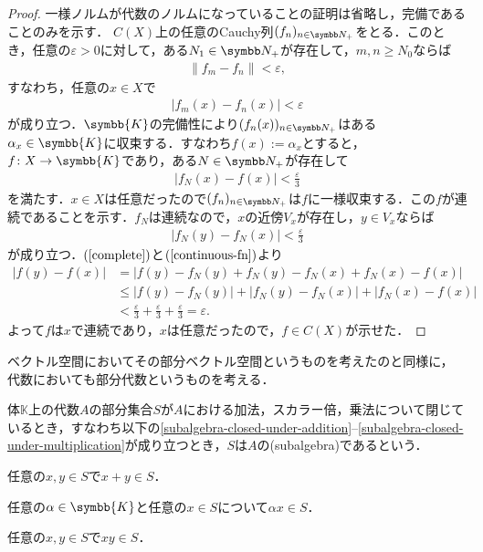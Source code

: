 \documentclass[../main.tex]{subfiles}
\begin{document}
\begin{proof} 一様ノルムが代数のノルムになっていることの証明は省略し，完備であることのみを示す．
\(C(X)\)上の任意のCauchy列\((f_n)_{n \in \PositiveInteger}\)をとる．このとき，任意の\(\varepsilon > 0\)に対して，ある\(N_1 \in \PositiveInteger\)が存在して，\(m, n \geq N_0\)ならば
\begin{align*}
  \lVert f_m - f_n \rVert < \varepsilon,
\end{align*}
すなわち，任意の\(x \in X\)で
\begin{align*}
  |f_m(x) - f_n(x)| < \varepsilon
\end{align*}
が成り立つ．\(\symbb{K}\)の完備性により\((f_n(x))_{n \in \PositiveInteger}\)はある\(\alpha_x \in \symbb{K}\)に収束する．すなわち\(f(x) := \alpha_x\)とすると，\(f\colon X \to \symbb{K}\)であり，ある\(N \in \PositiveInteger\)が存在して
\begin{align}
  |f_N(x) - f(x)| < \frac{\varepsilon}{3}
  \label{complete}
\end{align}
を満たす．\(x \in X\)は任意だったので\((f_n)_{n \in \PositiveInteger}\)は\(f\)に一様収束する．この\(f\)が連続であることを示す．\(f_N\)は連続なので，\(x\)の近傍\(V_x\)が存在し，\(y \in V_x\)ならば
\begin{align}
  |f_N(y) - f_N(x)| < \frac{\varepsilon}{3}
  \label{continuous-fn}
\end{align}
が成り立つ．\((\ref{complete})\)と\((\ref{continuous-fn})\)より
\begin{align*}
  |f(y) - f(x)|
  &= |f(y) - f_N(y) + f_N(y) - f_N(x) + f_N(x) - f(x)| \\
  &\leq |f(y) - f_N(y)| + |f_N(y) - f_N(x)| + |f_N(x) - f(x)| \\
  &< \frac{\varepsilon}{3} + \frac{\varepsilon}{3} + \frac{\varepsilon}{3} = \varepsilon.
\end{align*}
よって\(f\)は\(x\)で連続であり，\(x\)は任意だったので，\(f \in C(X)\)が示せた．
\end{proof}

ベクトル空間においてその部分ベクトル空間というものを考えたのと同様に，
代数においても部分代数というものを考える．

\begin{thmbox}
\begin{definition}[（部分代数）]
体\(\mathbb{K}\)上の代数\(A\)の部分集合\(S\)が\(A\)における加法，スカラー倍，乗法について閉じているとき，すなわち以下の\ref{subalgebra-closed-under-addition}--\ref{subalgebra-closed-under-multiplication}が成り立つとき，\(S\)は\(A\)の(subalgebra)であるという．
\begin{conditions}
    \item\label{subalgebra-closed-under-addition} 任意の\(x, y \in S\)で\(x + y \in S\)．
    \item 任意の\(\alpha \in \symbb{K}\)と任意の\(x \in S\)について\(\alpha x \in S\)．
    \item\label{subalgebra-closed-under-multiplication} 任意の\(x, y \in S\)で\(xy \in S\)．
\end{conditions}
\end{definition}
\end{thmbox}
\end{document}
